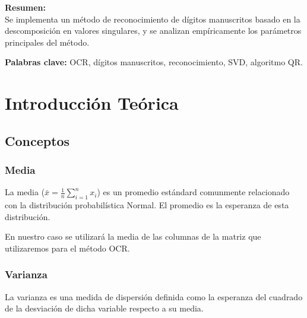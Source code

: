 \documentclass[a4paper,10pt,twoside]{article}
\begin{document}
\vspace{3cm}

\textbf{Resumen:} \\
Se implementa un método de reconocimiento de dígitos manuscritos basado en la descomposición en valores singulares, y se analizan empíricamente los parámetros principales del método.

\textbf{Palabras clave:}
OCR, dígitos manuscritos, reconocimiento, SVD, algoritmo QR.

\newpage




\tableofcontents

\newpage




\section{Introducción Teórica}

\subsection{Conceptos}

\subsubsection{Media}
La media ($\bar{x} = \frac{1}{n} \sum_{i=1}^{n} x_i$) es un promedio estándard comunmente relacionado con la distribución probabilística Normal. El promedio es la esperanza de esta distribución.

En nuestro caso se utilizará la media de las columnas de la matriz que utilizaremos para el método OCR.

\subsubsection{Varianza}
La varianza es una medida de dispersión definida como la esperanza del cuadrado de la desviación de dicha variable respecto a su media.
\end{document}
